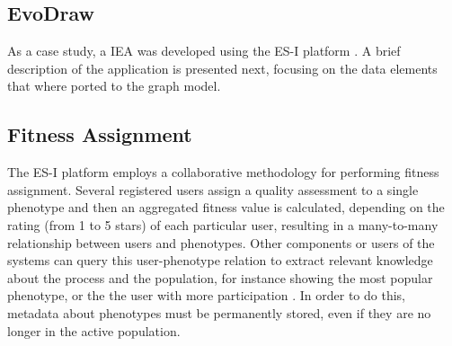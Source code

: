 \subsection{EvoDraw}
As a case study, a IEA was developed using the 
ES-I platform \cite{garcia2013evospace}.
A brief description of the application is presented next, focusing
on the data elements that where ported to the graph model.

\subsection{Fitness Assignment}
\label{sec:assignment}
The ES-I %
 platform employs a collaborative methodology for performing fitness
 assignment. Several registered users assign a quality assessment to a single
phenotype and then an aggregated fitness value is calculated,
depending on the rating (from 1 to 5 stars) of each particular user,  %
resulting in a many-to-many relationship between users and
phenotypes. 
Other components or users of the systems can %
query this user-phenotype relation to extract relevant
knowledge about the process and the population, for instance showing the
most popular phenotype, or the the user with more participation 
\cite{picbreeder}.
In order to do this, metadata about phenotypes %
must be permanently stored, even
if they are no longer in the active population. 

